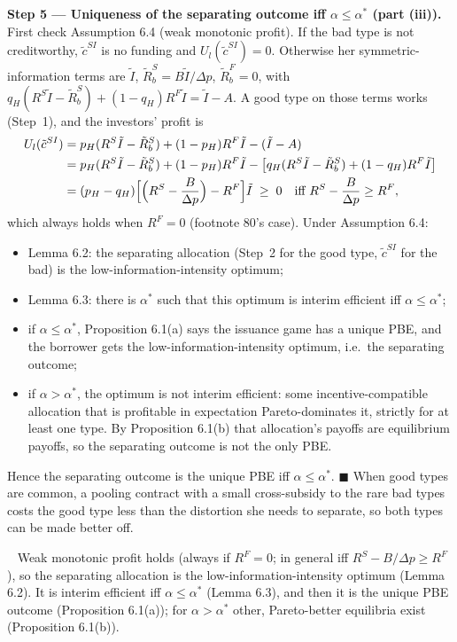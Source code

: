 \documentclass[11pt,a4paper]{article}
\newcommand{\step}[2]{\par\medskip\noindent\textbf{Step #1 --- #2.}~}
\newcommand{\answer}[1]{\par\smallskip\noindent\fbox{\textbf{Answer #1.}}~}
\begin{document}
\step{5}{Uniqueness of the separating outcome iff $\alpha\le\alpha^*$ (part (iii))} First check
Assumption 6.4 (weak monotonic profit). If the bad type is not creditworthy, $\tilde c^{SI}$ is no funding
and $U_l(\tilde c^{SI})=0$. Otherwise her symmetric-information terms are $\tilde I$,
$\tilde R_b^S=B\tilde I/\Delta p$, $\tilde R_b^F=0$, with
$q_H(R^S\tilde I-\tilde R_b^S)+(1-q_H)R^F\tilde I=\tilde I-A$. A good type on those terms works (Step~1),
and the investors' profit is
\begin{align}
  U_l(\tilde c^{SI}) &= p_H(R^S\tilde I-\tilde R_b^S)+(1-p_H)R^F\tilde I-(\tilde I-A) \nonumber\\
  &= p_H(R^S\tilde I-\tilde R_b^S)+(1-p_H)R^F\tilde I-\bigl[q_H(R^S\tilde I-\tilde R_b^S)+(1-q_H)R^F\tilde I\bigr] \nonumber\\
  &= (p_H-q_H)\Bigl[\Bigl(R^S-\frac{B}{\Delta p}\Bigr)-R^F\Bigr]\tilde I \;\ge\; 0
     \quad\text{iff } R^S-\frac{B}{\Delta p}\ge R^F, \label{t3e12-wmp}
\end{align}
which always holds when $R^F=0$ (footnote 80's case). Under Assumption 6.4:
\begin{itemize}
  \item Lemma 6.2: the separating allocation (Step~2 for the good type, $\tilde c^{SI}$ for the bad) is the low-information-intensity optimum;
  \item Lemma 6.3: there is $\alpha^*$ such that this optimum is interim efficient iff $\alpha\le\alpha^*$;
  \item if $\alpha\le\alpha^*$, Proposition 6.1(a) says the issuance game has a unique PBE, and the borrower gets the low-information-intensity optimum, i.e.\ the separating outcome;
  \item if $\alpha>\alpha^*$, the optimum is not interim efficient: some incentive-compatible allocation that is profitable in expectation Pareto-dominates it, strictly for at least one type. By Proposition 6.1(b) that allocation's payoffs are equilibrium payoffs, so the separating outcome is not the only PBE.
\end{itemize}
Hence the separating outcome is the unique PBE iff $\alpha\le\alpha^*$. $\blacksquare$ When good types are
common, a pooling contract with a small cross-subsidy to the rare bad types costs the good type less than
the distortion she needs to separate, so both types can be made better off.

\answer{(iii)} Weak monotonic profit holds (always if $R^F=0$; in general iff $R^S-B/\Delta p\ge R^F$), so the separating allocation is the low-information-intensity optimum (Lemma 6.2). It is interim efficient iff $\alpha\le\alpha^*$ (Lemma 6.3), and then it is the unique PBE outcome (Proposition 6.1(a)); for $\alpha>\alpha^*$ other, Pareto-better equilibria exist (Proposition 6.1(b)).
\end{document}
